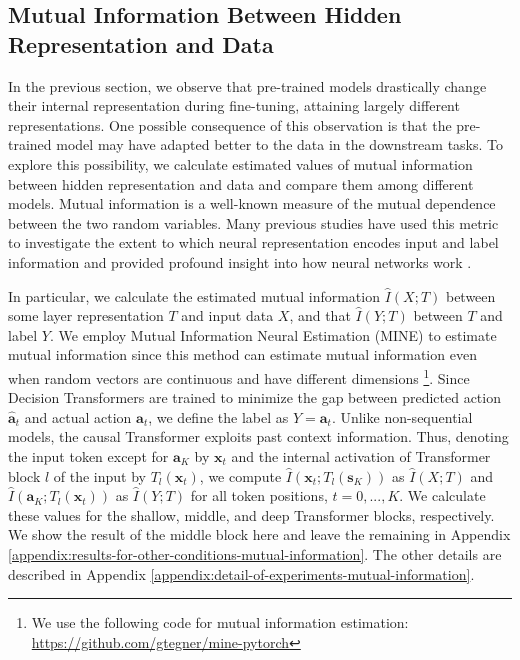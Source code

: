 \subsection{Mutual Information Between Hidden Representation and Data}
\label{section:mutual-information-between-hidden-representation-and-input-and-label}
In the previous section, we observe that pre-trained models drastically change their internal representation during fine-tuning, attaining largely different representations. One possible consequence of this observation is that the pre-trained model may have adapted better to the data in the downstream tasks. To explore this possibility, we calculate estimated values of mutual information between hidden representation and data and compare them among different models. Mutual information is a well-known measure of the mutual dependence between the two random variables. Many previous studies have used this metric to investigate the extent to which neural representation encodes input and label information and provided profound insight into how neural networks work \cite{tishby2015deep,shwartz2017opening,hafez2019information,goldfeld2020information,geiger2021information}.

In particular, we calculate the estimated mutual information $\hat{I}(X; T)$ between some layer representation $T$ and input data $X$, and that $\hat{I}(Y; T)$ between $T$ and label $Y$. We employ Mutual Information Neural Estimation (MINE) \cite{pmlr-v80-belghazi18a} to estimate mutual information since this method can estimate mutual information even when random vectors are continuous and have different dimensions \footnote{We use the following code for mutual information estimation: \href{https://github.com/gtegner/mine-pytorch}{https://github.com/gtegner/mine-pytorch}}. Since Decision Transformers are trained to minimize the gap between predicted action $\hat{\bm{a}}_t$ and actual action $\bm{a}_t$, we define the label as $Y = \bm{a}_t$. Unlike non-sequential models, the causal Transformer exploits past context information. Thus, denoting the input token except for $\bm{a}_K$ by $\bm{x}_t$ and the internal activation of Transformer block $l$ of the input by $T_l(\bm{x}_t)$, we compute $\hat{I}(\bm{x}_t; T_l(\bm{s}_K))$ as $\hat{I}(X; T)$ and $\hat{I}(\bm{a}_K; T_l(\bm{x}_t))$ as $\hat{I}(Y; T)$ for all token positions, $t = 0, ..., K$. We calculate these values for the shallow, middle, and deep Transformer blocks, respectively. We show the result of the middle block here and leave the remaining in Appendix \ref{appendix:results-for-other-conditions-mutual-information}. The other details are described in Appendix \ref{appendix:detail-of-experiments-mutual-information}.

